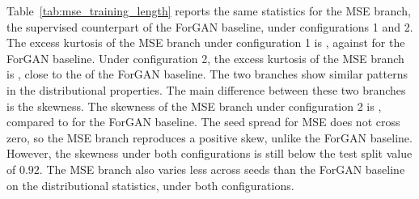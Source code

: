 Table~\ref{tab:mse_training_length} reports the same statistics for the MSE branch, the supervised counterpart of the ForGAN baseline, under configurations 1 and 2. The excess kurtosis of the MSE branch under configuration 1 is , against  for the ForGAN baseline. Under configuration 2, the excess kurtosis of the MSE branch is , close to the  of the ForGAN baseline. The two branches show similar patterns in the distributional properties.
The main difference between these two branches is the skewness. The skewness of the MSE branch under configuration 2 is , compared to  for the ForGAN baseline. The seed spread for MSE does not cross zero, so the MSE branch reproduces a positive skew, unlike the ForGAN baseline. However, the skewness under both configurations is still below the test split value of $0.92$. The MSE branch also varies less across seeds than the ForGAN baseline on the distributional statistics, under both configurations.

